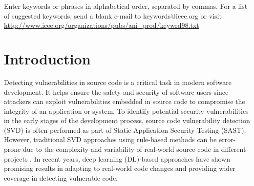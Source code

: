 \documentclass{ieeeaccess}
\begin{document}
\begin{keywords}
Enter keywords or phrases in alphabetical 
order, separated by commas. For a list of suggested keywords, send a blank 
e-mail to keywords@ieee.org or visit \underline
{http://www.ieee.org/organizations/pubs/ani\_prod/keywrd98.txt}
\end{keywords}

\titlepgskip=-15pt

\maketitle

\section{Introduction}\label{sec:I}
\par %
Detecting vulnerabilities in source code is a critical task in modern software development. It helps ensure the safety and security of software users since attackers can exploit vulnerabilities embedded in source code \cite{cwe22,cwe352,cwe601,cwe79,cwe94,CWE-77,CWE-89} to compromise the integrity of an application or system. To identify potential security vulnerabilities in the early stages of the development process, source code vulnerability detection (SVD) is often performed as part of Static Application Security Testing (SAST). However, traditional SVD approaches using  rule-based \cite{rule_tool1, rule_tool2, rule_tool3, rule_tool4, rule_tool5, rule_tool6, coverity} methods can be error-prone due to the complexity and variability of real-world source code in different projects \cite{sast_tools_study}. In recent years, deep learning (DL)-based approaches \cite{Linevd, MVD, vuldeekeeper, SySeVR, VulDeeLocator, DeepWukong, VUDENC, func_level_1, func_level_2, func_level_4, devign, Are, vuldeepeeker2} have shown promising results in adapting to real-world code changes and providing wider coverage in detecting vulnerable code.

 
\end{document}
